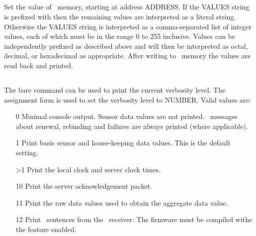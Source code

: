\subsection[eepromRead]{}

Set the value of \eeprom\ memory, starting at address ADDRESS. If the
VALUES string is prefixed with  then the remaining values are
interpreted as a literal string. Otherwise the VALUES string is
interpreted as a comma-separated list of integer values, each of which
must be in the range 0 to 255 inclusive. Values can be independently
prefixed as described above and will then be interpreted as octal,
decimal, or hexadecimal as appropriate. After writing to \eeprom\
memory the values are read back and printed.



\subsection[verbosity]{\newline{}}

The bare  command can be used to print the current
verbosity level. The assignment form is used to set the verbosity
level to NUMBER. Valid values are:
\begin{enumerate}
\item[0] Minimal console output. Sensor data values are not
  printed. \dhcp\ messages about renewal, rebinding and failures are
  always printed (where applicable).
\item[1] Print basic sensor and house-keeping data values. This is the
  default setting.
\item[>1] Print the local clock and server clock times.
\item[10] Print the server acknowledgement packet.
\item[11] Print the raw data values used to obtain the aggregate
  data value.
\item[12] Print \nmea\ sentences from the \gnss\ receiver. The
  firmware must be compiled withe the  feature
  enabled.
\end{enumerate}

